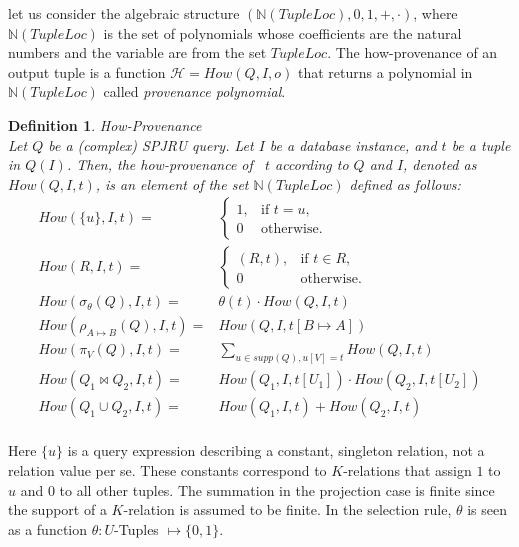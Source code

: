 \documentclass[preprint,12pt,sort&compress]{elsarticle}
\newtheorem{definition}{Definition}[section]
\begin{document}
let us consider the algebraic structure $(\mathbb{N}(TupleLoc), 0, 1, +, \cdot)$, where $\mathbb{N}(TupleLoc)$ is the set of polynomials whose coefficients are the natural numbers and the variable are from the set $TupleLoc$. 
The how-provenance of an output tuple is a function $\mathcal{H} = How(Q, I, o)$ that returns a polynomial in $\mathbb{N}(TupleLoc)$ called \emph{provenance polynomial}. 


\begin{definition}{How-Provenance}\\
\label{definition:how_provenance}
		Let $Q$ be a (complex) SPJRU query. Let $I$ be a database instance, and $t$ be a tuple in $Q(I)$. Then, the \emph{how-provenance} of ~$t$ according to $Q$ and $I$, denoted as $How(Q, I, t)$, is an element of the set $\mathbb{N}(TupleLoc)$ defined as follows:
\[
	\begin{array}{rl}
		How(\{u\}, I, t) = & \begin{cases}
			1, & \mbox{if } t = u,\\
			0 & \mbox{otherwise}.
		\end{cases}\\
		How(R, I, t) = & \begin{cases}
			(R, t), & \mbox{if } t \in R,\\
			0 & \mbox{otherwise}.
		\end{cases}\\
		How(\sigma_\theta(Q), I, t) = & \theta(t) \cdot How(Q, I, t) \\
		How(\rho_{A \mapsto B}(Q), I, t) = & How(Q, I, t[B \mapsto A]) \\
		How(\pi_V(Q), I, t) = & \sum_{u \in supp(Q), u[V] = t} How(Q, I, t) \\
		How(Q_1 \Join Q_2, I, t) = & How(Q_1, I, t[U_1]) \cdot How(Q_2, I, t[U_2]) \\
		How(Q_1 \cup Q_2, I, t) = & How(Q_1, I, t) + How(Q_2, I, t)\\
	\end{array}
\]
\end{definition}

Here $\{u\}$ is a query expression describing a constant, singleton relation, not a relation value per se. These constants correspond to $K$-relations that assign $1$ to $u$ and $0$ to all other tuples.
The summation in the projection case is finite since the support of a $K$-relation is assumed to be finite. 
In the selection rule, $\theta$ is seen as a function $\theta: U$-Tuples $\mapsto \{0, 1\}$.
\end{document}
